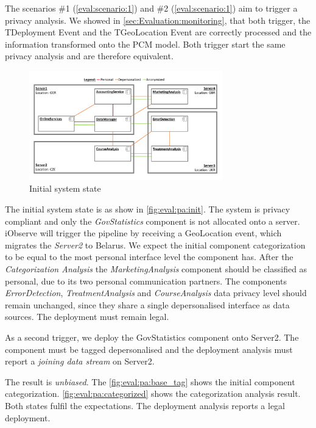 The scenarios \#1 (\autoref{eval:scenario:1}) and \#2 (\autoref{eval:scenario:1}) aim to trigger a privacy analysis. We showed in \autoref{sec:Evaluation:monitoring}, that both trigger, the TDeployment Event and the TGeoLocation Event are correctly processed and the information transformed onto the PCM model. Both trigger start the same privacy analysis and are therefore equivalent. 

\begin{figure}[h]
	\centering
	\includegraphics[trim = 0mm 10mm 0mm 10mm, clip, width=0.75\textwidth]{graphs/medSys_eval_pa_init}
	\caption{Initial system state}
	\label{fig:eval:pa:init}
\end{figure}

The initial system state is as show in \autoref{fig:eval:pa:init}. The system is privacy compliant and only the \textit{GovStatistics} component is not allocated onto a server. iObserve will trigger the pipeline by receiving a GeoLocation event, which migrates the \textit{Server2} to Belarus. We expect the initial component categorization to be equal to the most personal interface level the component has. After the \textit{Categorization Analysis} the \textit{MarketingAnalysis} component should be classified as personal, due to its two personal communication partners. The components \textit{ErrorDetection}, \textit{TreatmentAnalysis} and \textit{CourseAnalysis} data privacy level should remain unchanged, since they share a single depersonalised interface as data sources. The deployment must remain legal.

As a second trigger, we deploy the GovStatistics component onto Server2. The component must be tagged depersonalised and the deployment analysis must report a \textit{joining data stream} on Server2.

The result is \textit{unbiased}. The \autoref{fig:eval:pa:base_tag} shows the initial component categorization. \autoref{fig:eval:pa:categorized} shows the categorization analysis result. Both states fulfil the expectations. The deployment analysis reports a legal deployment.

